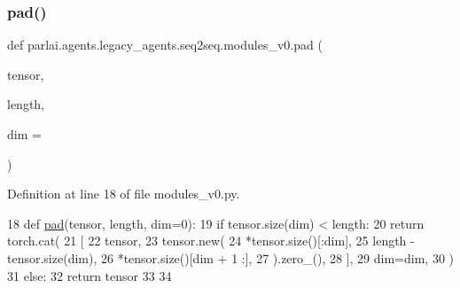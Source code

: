 \subsubsection{\texorpdfstring{pad()}{pad()}}
{\footnotesize\ttfamily def parlai.\+agents.\+legacy\+\_\+agents.\+seq2seq.\+modules\+\_\+v0.\+pad (\begin{DoxyParamCaption}\item[{}]{tensor,  }\item[{}]{length,  }\item[{}]{dim = {} }\end{DoxyParamCaption})}



Definition at line 18 of file modules\+\_\+v0.\+py.


\begin{DoxyCode}
18 \textcolor{keyword}{def }\hyperlink{namespaceparlai_1_1agents_1_1legacy__agents_1_1seq2seq_1_1modules__v0_afab760d03d96d6a368953b7173ea189a}{pad}(tensor, length, dim=0):
19     \textcolor{keywordflow}{if} tensor.size(dim) < length:
20         \textcolor{keywordflow}{return} torch.cat(
21             [
22                 tensor,
23                 tensor.new(
24                     *tensor.size()[:dim],
25                     length - tensor.size(dim),
26                     *tensor.size()[dim + 1 :],
27                 ).zero\_(),
28             ],
29             dim=dim,
30         )
31     \textcolor{keywordflow}{else}:
32         \textcolor{keywordflow}{return} tensor
33 
34 
\end{DoxyCode}
